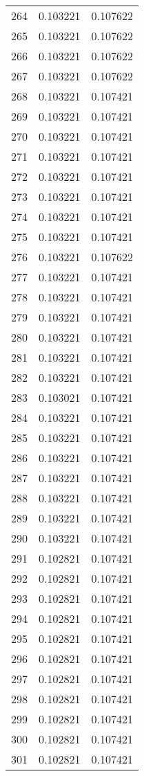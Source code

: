 \begin{longtable}{rrr}
264 & 0.103221 & 0.107622 \\
265 & 0.103221 & 0.107622 \\
266 & 0.103221 & 0.107622 \\
267 & 0.103221 & 0.107622 \\
268 & 0.103221 & 0.107421 \\
269 & 0.103221 & 0.107421 \\
270 & 0.103221 & 0.107421 \\
271 & 0.103221 & 0.107421 \\
272 & 0.103221 & 0.107421 \\
273 & 0.103221 & 0.107421 \\
274 & 0.103221 & 0.107421 \\
275 & 0.103221 & 0.107421 \\
276 & 0.103221 & 0.107622 \\
277 & 0.103221 & 0.107421 \\
278 & 0.103221 & 0.107421 \\
279 & 0.103221 & 0.107421 \\
280 & 0.103221 & 0.107421 \\
281 & 0.103221 & 0.107421 \\
282 & 0.103221 & 0.107421 \\
283 & 0.103021 & 0.107421 \\
284 & 0.103221 & 0.107421 \\
285 & 0.103221 & 0.107421 \\
286 & 0.103221 & 0.107421 \\
287 & 0.103221 & 0.107421 \\
288 & 0.103221 & 0.107421 \\
289 & 0.103221 & 0.107421 \\
290 & 0.103221 & 0.107421 \\
291 & 0.102821 & 0.107421 \\
292 & 0.102821 & 0.107421 \\
293 & 0.102821 & 0.107421 \\
294 & 0.102821 & 0.107421 \\
295 & 0.102821 & 0.107421 \\
296 & 0.102821 & 0.107421 \\
297 & 0.102821 & 0.107421 \\
298 & 0.102821 & 0.107421 \\
299 & 0.102821 & 0.107421 \\
300 & 0.102821 & 0.107421 \\
301 & 0.102821 & 0.107421 \\

\end{longtable}
